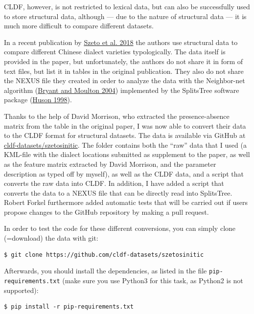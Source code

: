 \documentclass[
  a4paper,
  14pt,
  oneside,
  tablecaptionabove
]{scrbook}
\begin{document}
CLDF, however, is not restricted to lexical data, but can also be
successfully used to store structural data, although --- due to the
nature of structural data --- it is much more difficult to compare
different datasets.
 
In a recent publication by
\href{http://bibliography.lingpy.org?key=Szeto2018}{Szeto et al. 2018}
the authors use structural data to compare different Chinese dialect
varieties typologically. The data itself is provided in the paper, but
unfortunately, the authors do not share it in form of text files, but
list it in tables in the original publication. They also do not share
the NEXUS file they created in order to analyze the data with the
Neighbor-net algorithm (\href{http://bibliography.lingpy.org?key=Bryant2004}{Bryant and Moulton
2004}) implemented by the SplitsTree software package (\href{http://bibliography.lingpy.org?key=Huson1998}{Huson 1998}).

Thanks to the help of David Morrison, who extracted the presence-absence
matrix from the table in the original paper, I was now able to convert
their data to the CLDF format for structural datasets. The data is
available via GitHub at
\href{https://github.com/cldf-datasets/szetosinitic}{cldf-datasets/szetosinitic}.
The folder contains both the \enquote{raw} data that I used (a KML-file
with the dialect locations submitted as supplement to the paper, as well
as the feature matrix extracted by David Morrison, and the parameter
description as typed off by myself), as well as the CLDF data, and a
script that converts the raw data into CLDF. In addition, I have added a
script that converts the data to a NEXUS file that can be directly read
into SplitsTree. Robert Forkel furthermore added automatic tests that
will be carried out if users propose changes to the GitHub repository by
making a pull request.

In order to test the code for these different conversions, you can
simply clone (=download) the data with git:

\begin{lstlisting}
$ git clone https://github.com/cldf-datasets/szetosinitic
\end{lstlisting}

Afterwards, you should install the dependencies, as listed in the file
\lstinline!pip-requirements.txt! (make sure you use Python3 for this
task, as Python2 is not supported):

\begin{lstlisting}
$ pip install -r pip-requirements.txt
\end{lstlisting}
\end{document}
